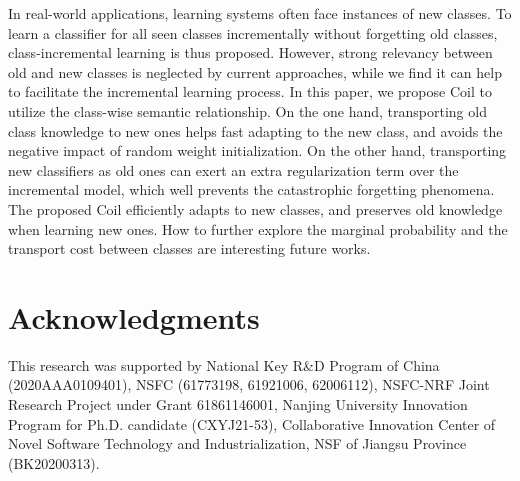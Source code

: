 \documentclass[sigconf]{acmart}
\newcommand{\name}{{\sc Coil }}
\begin{document}
In real-world applications, learning systems often face instances of new classes. To learn a classifier for all seen classes incrementally without forgetting old classes, class-incremental learning is thus proposed. However, strong relevancy between old and new classes is neglected by current approaches, while we find it can help to facilitate the incremental learning process.
In this paper, we propose \name to utilize the class-wise semantic relationship. On the one hand, 
transporting old class knowledge to new ones helps fast adapting to the new class, and avoids the negative impact of random weight initialization.  
On the other hand, transporting new classifiers as old ones can exert an extra regularization term over the incremental model, which well prevents the catastrophic forgetting phenomena.
The proposed \name efficiently adapts to new classes, and preserves old knowledge when learning new ones. 
How to further explore the marginal probability  and the transport cost between classes are interesting future works.


\section*{Acknowledgments}

This research was supported by National Key
R\&D Program of China (2020AAA0109401), NSFC (61773198, 61921006, 62006112), NSFC-NRF Joint Research Project under Grant 61861146001, Nanjing University Innovation Program for
Ph.D. candidate (CXYJ21-53), Collaborative Innovation Center of Novel Software Technology and Industrialization, NSF of Jiangsu Province (BK20200313).


	
\balance

\end{document}
